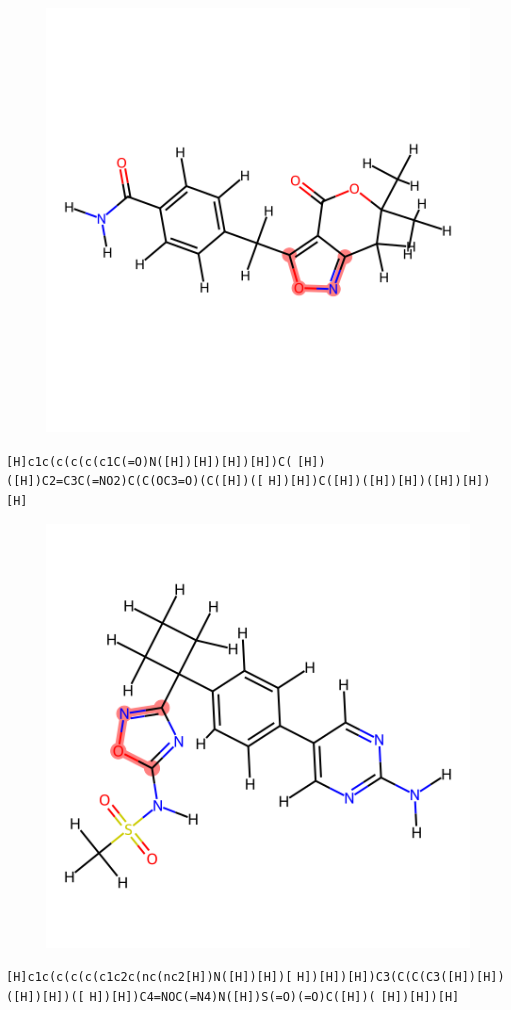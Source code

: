 \documentclass{article}
\begin{document}
\begin{figure}[ht]
\centering
    \includegraphics{mol150.png}
\end{figure}
\verb|[H]c1c(c(c(c(c1C(=O)N([H])[H])[H])[H])C(| \verb|[H])([H])C2=C3C(=NO2)C(C(OC3=O)(C([H])([| \verb|H])[H])C([H])([H])[H])([H])[H])[H]|

\begin{figure}[ht]
\centering
    \includegraphics{mol151.png}
\end{figure}
\verb|[H]c1c(c(c(c(c1c2c(nc(nc2[H])N([H])[H])[| \verb|H])[H])[H])C3(C(C(C3([H])[H])([H])[H])([| \verb|H])[H])C4=NOC(=N4)N([H])S(=O)(=O)C([H])(| \verb|[H])[H])[H]|
\end{document}
